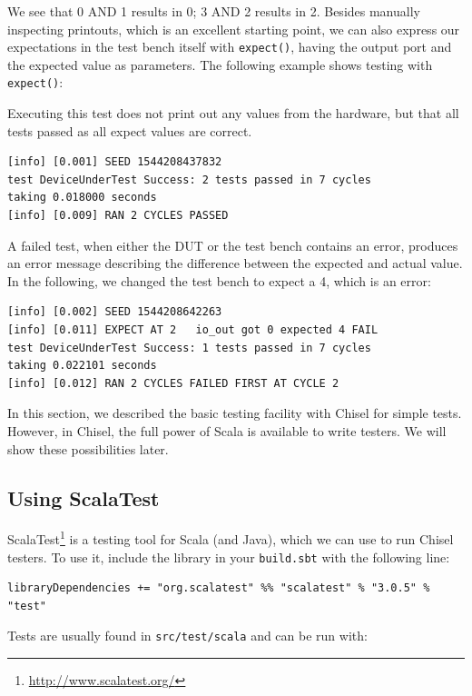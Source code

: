 \documentclass[%
    10pt,
    headinclude, footexclude,
    openright, %
    notitlepage,
    cleardoubleempty,
    headsepline,
    pointlessnumbers,
    bibtotoc, idxtotoc,
    ]{scrbook}
\newcommand{\code}[1]{{\small{\texttt{#1}}}}
\newcommand{\myref}[2]{\href{#1}{#2}}
\renewcommand{\myref}[2]{{#2}{\footnote{\url{#1}}}}
\begin{document}
\noindent We see that 0 AND 1 results in 0; 3 AND 2 results in 2.
Besides manually inspecting printouts, which is an excellent starting point, we can also
express our expectations in the test bench itself with \code{expect()},
having the output port and the expected value as parameters.
The following example shows testing with \code{expect()}:


\noindent Executing this test does not print out any values from the hardware,
but that all tests passed as all expect values are correct.

\begin{verbatim}
[info] [0.001] SEED 1544208437832
test DeviceUnderTest Success: 2 tests passed in 7 cycles
taking 0.018000 seconds
[info] [0.009] RAN 2 CYCLES PASSED
\end{verbatim}

\noindent A failed test, when either the DUT or the test bench contains an error,
produces an error message describing the difference between the expected and actual
value. In the following, we changed the test bench to expect a 4, which is an error:

\begin{verbatim}
[info] [0.002] SEED 1544208642263
[info] [0.011] EXPECT AT 2   io_out got 0 expected 4 FAIL
test DeviceUnderTest Success: 1 tests passed in 7 cycles
taking 0.022101 seconds
[info] [0.012] RAN 2 CYCLES FAILED FIRST AT CYCLE 2
\end{verbatim}

In this section, we described the basic testing facility with Chisel for simple tests.
However, in Chisel, the full power of Scala is available to write testers.
We will show these possibilities later.

\subsection{Using ScalaTest}

\myref{http://www.scalatest.org/}{ScalaTest} is a testing tool for Scala (and Java),
which we can use to run Chisel testers.
To use it, include the library in your \code{build.sbt} with the following line:

\begin{verbatim}
libraryDependencies += "org.scalatest" %% "scalatest" % "3.0.5" % "test"
\end{verbatim}

\noindent Tests are usually found in \code{src/test/scala} and can be run with:
\end{document}
